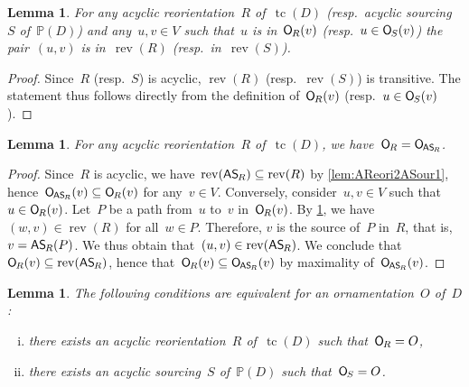 \documentclass{amsart}
\newtheorem{lemma}[theorem]{Lemma}
\theoremstyle{definition}
\DeclareMathOperator{\tc}{tc} %
\newcommand{\vincent}[1]{\todo[size=\tiny,color=blue!30]{ #1 \\ \hfill --- V.}\,}
\newcommand{\mymap}[2]{\mathsf{#1}_{\hspace{-.7pt}#2}}
\newcommand{\orn}[1]{\mymap{O}{#1}}  %
\newcommand{\reori}[1]{\mymap{R}{#1}}  %
\DeclareMathOperator{\rev}{rev} %
\newcommand{\sour}[1]{\mymap{S}{#1}}  %
\newcommand{\asour}[1]{\mymap{AS}{#1}}  %
\newcommand{\PP}{\mathbb P} %
\begin{document}
\begin{lemma}
\label{lem:acyclicSimplifiesDef}
For any acyclic reorientation~$R$ of~$\tc(D)$ (resp.~acyclic sourcing~$S$ of~$\PP(D)$) and any~$u,v \in V$ such that~$u$ is in~$\orn{R}(v)$ (resp.~$u \in \orn{S}(v)$) the pair~$(u,v)$ is in~$\rev(R)$ (resp.~in~$\rev(S)$).
\end{lemma}

\begin{proof}
Since~$R$ (resp.~$S$) is acyclic, $\rev(R)$ (resp.~$\rev(S)$) is transitive.
The statement thus follows directly from the definition of~$\orn{R}(v)$ (resp.~$u \in \orn{S}(v)$).
\end{proof}

\begin{lemma}
\label{lem:AReori2ASour2AOrn}
For any acyclic reorientation~$R$ of~$\tc(D)$, we have~$\orn{R} = \orn{\asour{R}}$.
\end{lemma}

\begin{proof}
Since~$R$ is acyclic, we have~$\rev(\asour{R}) \subseteq \rev(R)$ by \cref{lem:AReori2ASour1}, hence~$\orn{\asour{R}}(v) \subseteq \orn{R}(v)$ for any~$v \in V$.
Conversely, consider~$u,v \in V$ such that~$u \in \orn{R}(v)$.
Let~$P$ be a path from~$u$ to~$v$ in~$\orn{R}(v)$.
By \cref{lem:acyclicSimplifiesDef}, we have~$(w,v) \in \rev(R)$ for all~$w \in P$.
Therefore, $v$ is the source of~$P$ in~$R$, that is, $v = \asour{R}(P)$.
We thus obtain that~$(u,v) \in \rev(\asour{R})$.
We conclude that~$\orn{R}(v) \subseteq \rev(\asour{R})$, hence that~$\orn{R}(v) \subseteq \orn{\asour{R}}(v)$ by maximality of~$\orn{\asour{R}}(v)$.
\end{proof}

%
%

%
%
\begin{lemma}
\label{lem:AOrn2}
The following conditions are equivalent for an ornamentation~$O$ of~$D$:
\begin{enumerate}[(i)]
\item there exists an acyclic reorientation~$R$ of~$\tc(D)$ such that~$\orn{R} = O$,
\item there exists an acyclic sourcing~$S$ of~$\PP(D)$ such that~$\orn{S} = O$.
\end{enumerate}
\end{lemma}
\end{document}
